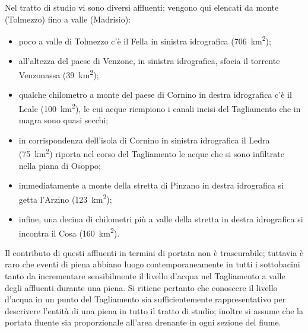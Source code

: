 Nel tratto di studio vi sono diversi affluenti; vengono qui elencati da monte (Tolmezzo) fino a valle (Madrisio):
%
\begin{itemize}
	\item poco a valle di Tolmezzo c'è il Fella in sinistra idrografica (\SI{706}{\kilo\m\tothe{2}});
	\item all'altezza del paese di Venzone, in sinistra idrografica, sfocia il torrente Venzonassa (\SI{39}{\kilo\m\tothe{2}});
	\item qualche chilometro a monte del paese di Cornino in destra idrografica c'è il Leale (\SI{100}{\kilo\m\tothe{2}}), le cui acque riempiono i canali incisi del Tagliamento che in magra sono quasi secchi;
	\item in corrispondenza dell'isola di Cornino in sinistra idrografica il Ledra (\SI{75}{\kilo\m\tothe{2}}) riporta nel corso del Tagliamento le acque che si sono infiltrate nella piana di Osoppo;
	\item immediatamente a monte della stretta di Pinzano in destra idrografica si getta l'Arzino (\SI{123}{\kilo\m\tothe{2}});
	\item infine, una decina di chilometri più a valle della stretta in destra idrografica si incontra il Cosa (\SI{160}{\kilo\m\tothe{2}}).
\end{itemize}
%
Il contributo di questi affluenti in termini di portata non è trascurabile; tuttavia è raro che eventi di piena abbiano luogo contemporaneamente in tutti i sottobacini tanto da incrementare sensibilmente il livello d'acqua nel Tagliamento a valle degli affluenti durante una piena.
Si ritiene pertanto che conoscere il livello d'acqua in un punto del Tagliamento sia sufficientemente rappresentativo per descrivere l'entità di una piena in tutto il tratto di studio; inoltre si assume che la portata fluente sia proporzionale all'area drenante in ogni sezione del fiume.

